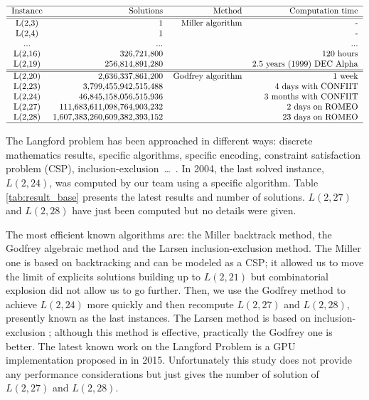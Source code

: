 \begin{table}[t!]
\centering
\[
\begin{tabular}{c r r r}
  \hline
  Instance & Solutions & Method & Computation time\\
  \hline
  \hline
  L(2,3) & 1 &  Miller algorithm & - \\
  L(2,4) & 1 & & - \\ 
  ... & ... & & ...  \\
  L(2,16) & 326,721,800 & & 120 hours  \\
  L(2,19) & 256,814,891,280 & & 2.5 years (1999) DEC Alpha \\
  \hline
  \hline
  L(2,20) & 2,636,337,861,200 & Godfrey algorithm & 1 week \\
  L(2,23) & 3,799,455,942,515,488 & &  4 days with CONFIIT \\
  L(2,24) & 46,845,158,056,515,936 & & 3 months with CONFIIT \\
  L(2,27) & 111,683,611,098,764,903,232 & & 2 days on ROMEO \\
  L(2,28) & 1,607,383,260,609,382,393,152 & & 23 days on ROMEO \\
  \hline
\end{tabular}
\]
\caption{Solutions and time for Langford problem using different methods}
\label{tab:result_base}
\end{table}

The Langford problem has been approached in different ways: discrete mathematics results, specific algorithms, specific encoding, constraint satisfaction problem (CSP), inclusion-exclusion~\ldots~\cite{Mil00,apes-26,Smi00,larsen2009counting}.
In 2004, the last solved instance, $L(2,24)$, was computed by our team \cite{CReSTIC-711} using a specific algorithm. 
Table \ref{tab:result_base} presents the latest results and number of solutions. 
$L(2,27)$ and $L(2,28)$ have just been computed but no details were given. 

The most efficient known algorithms are: the Miller backtrack method, the Godfrey algebraic method and the Larsen inclusion-exclusion method.
The Miller one is based on backtracking and can be modeled as a CSP\cite{habbas2005decomposition}; it allowed us to move the limit of explicits solutions building up to $L(2,21)$ but combinatorial explosion did not allow us to go further. 
Then, we use the Godfrey method to achieve $L(2,24)$ more quickly and then recompute $L(2,27)$ and $L(2,28)$, presently known as the last instances.
The Larsen method is based on inclusion-exclusion \cite{larsen2009counting}; although this method is effective, practically the Godfrey one is better. 
The latest known work on the Langford Problem is a GPU implementation proposed in \cite{ASS_LGF} in 2015. Unfortunately this study does not provide any performance considerations but just gives the number of solution of $L(2,27)$ and $L(2,28)$.

